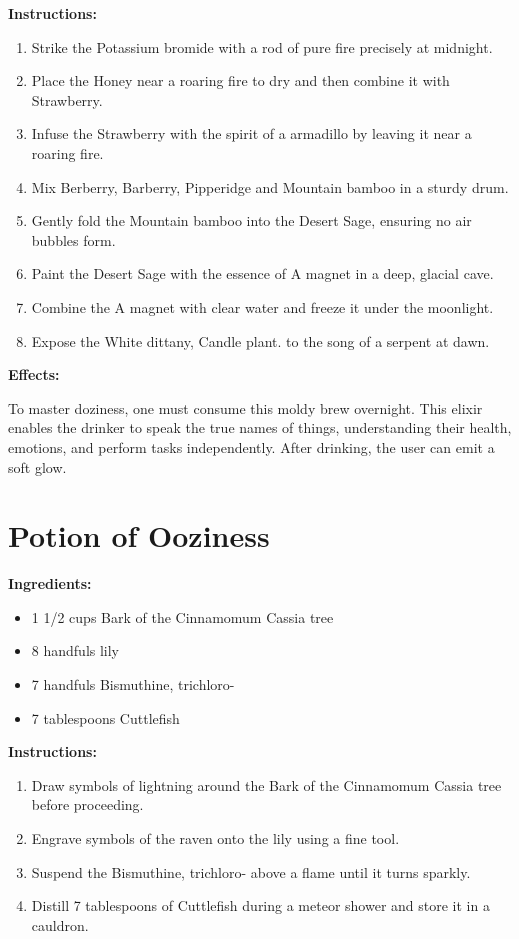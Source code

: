 \documentclass{article}
\begin{document}
\textbf{Instructions:}

\begin{enumerate}
  \item Strike the Potassium bromide with a rod of pure fire precisely at midnight.
  \item Place the Honey near a roaring fire to dry and then combine it with Strawberry.
  \item Infuse the Strawberry with the spirit of a armadillo by leaving it near a roaring fire.
  \item Mix Berberry, Barberry, Pipperidge and Mountain bamboo in a sturdy drum.
  \item Gently fold the Mountain bamboo into the Desert Sage, ensuring no air bubbles form.
  \item Paint the Desert Sage with the essence of A magnet in a deep, glacial cave.
  \item Combine the A magnet with clear water and freeze it under the moonlight.
  \item Expose the White dittany, Candle plant. to the song of a serpent at dawn.
\end{enumerate}

\textbf{Effects:}

To master doziness, one must consume this moldy brew overnight. This elixir enables the drinker to speak the true names of things, understanding their health, emotions, and perform tasks independently. After drinking, the user can emit a soft glow.

\newpage
\section*{Potion of Ooziness}

\textbf{Ingredients:}

\begin{itemize}
  \item 1 1/2 cups Bark of the Cinnamomum Cassia tree
  \item 8 handfuls lily
  \item 7 handfuls Bismuthine, trichloro-
  \item 7 tablespoons Cuttlefish
\end{itemize}

\textbf{Instructions:}

\begin{enumerate}
  \item Draw symbols of lightning around the Bark of the Cinnamomum Cassia tree before proceeding.
  \item Engrave symbols of the raven onto the lily using a fine tool.
  \item Suspend the Bismuthine, trichloro- above a flame until it turns sparkly.
  \item Distill 7 tablespoons of Cuttlefish during a meteor shower and store it in a cauldron.
\end{enumerate}
\end{document}
